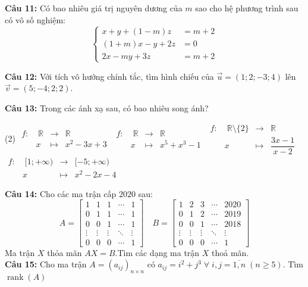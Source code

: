 \documentclass[12pt,a4paper]{article}
\begin{document}
\noindent\textbf{Câu 11:}  Có bao nhiêu giá trị nguyên dương của $m$ sao cho hệ phương trình sau có vô số nghiệm:
$$\begin{cases}x+y+(1-m)z&=m+2\\
(1+m)x-y+2z&=0\\
2x-my+3z&=m+2\end{cases}$$

\noindent\textbf{Câu 12:}  Với tích vô hướng chính tắc, tìm hình chiếu của $\overrightarrow{u}=\left(1;2;-3;4\right)$ lên $\overrightarrow{v}=\left(5;-4;2;2\right)$.

\noindent\textbf{Câu 13:}
Trong các ánh xạ sau, có bao nhiêu song ánh?
\begin{tasks}(2)
    \task[\textbullet]  $\begin{array}{cccl}
    f:&\; \mathbb{R} &\longrightarrow &\mathbb{R}\\
&x &\longmapsto &x^{2}-3 x+3 
    \end{array}$
    \task[\textbullet] $\begin{array}{cccl}
    f:&\; \mathbb{R} &\longrightarrow &\mathbb{R}\\
&x &\longmapsto &x^5+x^3-1 
    \end{array}$
    \task[\textbullet] $\begin{array}{cccl}
    f:&\; \mathbb{R} \setminus \{2\}&\longrightarrow &\mathbb{R}\\
&x &\longmapsto &\dfrac{3 x-1}{x-2} 
    \end{array}$
    \task[\textbullet] $\begin{array}{cccl}
    f:&\; [1 ;+\infty) &\longrightarrow &[-5;+\infty)\\
&x &\longmapsto &x^2 - 2x-4 
    \end{array}$
\end{tasks}

\noindent\textbf{Câu 14:}
Cho các ma trận cấp $2020$ sau:
$$
A=\left[\begin{array}{lllll}
1 & 1 & 1 & \cdots & 1 \\
0 & 1 & 1 & \cdots & 1 \\
0 & 0 & 1 & \cdots & 1 \\
\vdots & \vdots & \vdots & \ddots & \vdots \\
0 & 0 & 0 & \cdots & 1
\end{array}\right] \quad B=\left[\begin{array}{ccccc}
1 & 2 & 3 & \cdots & 2020 \\
0 & 1 & 2 & \cdots & 2019 \\
0 & 0 & 1 & \cdots & 2018 \\
\vdots & \vdots & \vdots & \ddots & \vdots \\
0 & 0 & 0 & \cdots & 1
\end{array}\right]
$$
Ma trận $X$ thỏa mãn $AX = B$.Tìm các dạng ma trận $X$ thoả mãn.\\

\noindent \textbf{Câu 15:} Cho ma trận $A=\left(a_{i j}\right)_{n \times n} \text{ có }  a_{i j}=i^{2}+j^{3} \;\forall\; i, j = \overline{1, n}\; (n \geq 5)$. Tìm $ \operatorname{rank}(A)$\\
\end{document}

